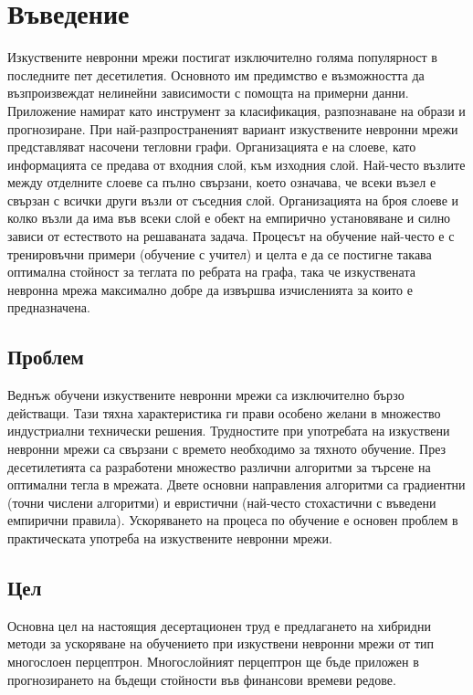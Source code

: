 \chapter*{Въведение}

Изкуствените невронни мрежи постигат изключително голяма популярност в последните пет десетилетия. Основното им предимство е възможността да възпроизвеждат нелинейни зависимости с помощта на примерни данни. Приложение намират като инструмент за класификация, разпознаване на образи и прогнозиране. При най-разпространеният вариант изкуствените невронни мрежи представляват насочени тегловни графи. Организацията е на слоеве, като информацията се предава от входния слой, към изходния слой. Най-често възлите между отделните слоеве са пълно свързани, което означава, че всеки възел е свързан с всички други възли от съседния слой. Организацията на броя слоеве и колко възли да има във всеки слой е обект на емпирично установяване и силно зависи от естеството на решаваната задача. Процесът на обучение най-често е с тренировъчни примери (обучение с учител) и целта е да се постигне такава оптимална стойност за теглата по ребрата на графа, така че изкуствената невронна мрежа максимално добре да извършва изчисленията за които е предназначена. 

\section*{Проблем}

Веднъж обучени изкуствените невронни мрежи са изключително бързо действащи. Тази тяхна характеристика ги прави особено желани в множество индустриални технически решения. Трудностите при употребата на изкуствени невронни мрежи са свързани с времето необходимо за тяхното обучение. През десетилетията са разработени множество различни алгоритми за търсене на оптимални тегла в мрежата. Двете основни направления алгоритми са градиентни (точни числени алгоритми) и евристични (най-често стохастични с въведени емпирични правила). Ускоряването на процеса по обучение е основен проблем в практическата употреба на изкуствените невронни мрежи.

\section*{Цел}

Основна цел на настоящия десертационен труд е предлагането на хибридни методи за ускоряване на обучението при изкуствени невронни мрежи от тип многослоен перцептрон. Многослойният перцептрон ще бъде приложен в прогнозирането на бъдещи стойности във финансови времеви редове. 

